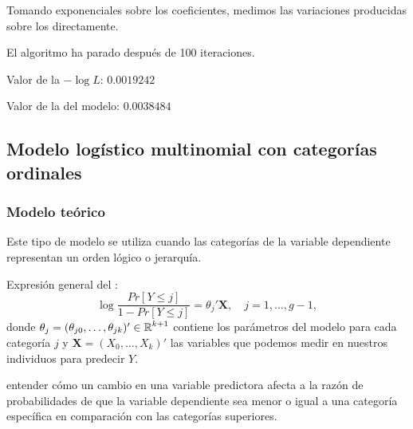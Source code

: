 Tomando exponenciales sobre los coeficientes, medimos las variaciones producidas sobre los  directamente.

El algoritmo ha parado después de 100 iteraciones.

Valor de la $-\log L:\,0.0019242$

Valor de la  del modelo: $0.0038484$
\subsection{Modelo logístico multinomial con categorías ordinales}
\subsubsection{Modelo teórico}
Este tipo de modelo se utiliza cuando las categorías de la variable dependiente representan un orden lógico o jerarquía.

Expresión general del : \[ \log\dfrac{Pr[Y\le j]}{1-Pr[Y\le j]}=\theta_j'\mathbf{X},\quad j=1,\dots,g-1, \] donde $\theta_j=(\theta_{j0},\dots,\theta_{jk})'\in\operatorname{\mathbb{R}}^{k+1}$ contiene los parámetros del modelo para cada categoría $j$ y $\mathbf{X}=(X_0,\dots,X_k)'$ las variables que podemos medir en nuestros individuos para predecir $Y$.

 entender cómo un cambio en una variable predictora afecta a la razón de probabilidades de que la variable dependiente sea menor o igual a una categoría específica en comparación con las categorías superiores.
